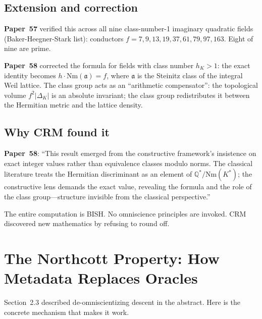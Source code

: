 \documentclass[11pt,twoside,openany]{report}
\theoremstyle{remark}
\newcommand{\BISH}{\textsf{BISH}}
\newcommand{\paperref}[1]{\textbf{Paper~#1}}
\begin{document}
\subsection*{Extension and correction}

\paperref{57} verified this across all nine class-number-1 imaginary quadratic fields (Baker-Heegner-Stark list): conductors $f = 7, 9, 13, 19, 37, 61, 79, 97, 163$. Eight of nine are prime.

\paperref{58} corrected the formula for fields with class number $h_K > 1$: the exact identity becomes $h \cdot \mathrm{Nm}(\mathfrak{a}) = f$, where $\mathfrak{a}$ is the Steinitz class of the integral Weil lattice. The class group acts as an ``arithmetic compensator'': the topological volume $f^2|\Delta_K|$ is an absolute invariant; the class group redistributes it between the Hermitian metric and the lattice density.

\subsection*{Why CRM found it}

\paperref{58}: ``This result emerged from the constructive framework's insistence on exact integer values rather than equivalence classes modulo norms. The classical literature treats the Hermitian discriminant as an element of $\mathbb{Q}^*/\mathrm{Nm}(K^*)$; the constructive lens demands the exact value, revealing the formula and the role of the class group---structure invisible from the classical perspective.''

The entire computation is \BISH. No omniscience principles are invoked. CRM discovered new mathematics by refusing to round off.


\section{The Northcott Property: How Metadata Replaces Oracles}

Section~2.3 described de-omniscientizing descent in the abstract. Here is the concrete mechanism that makes it work.
\end{document}
